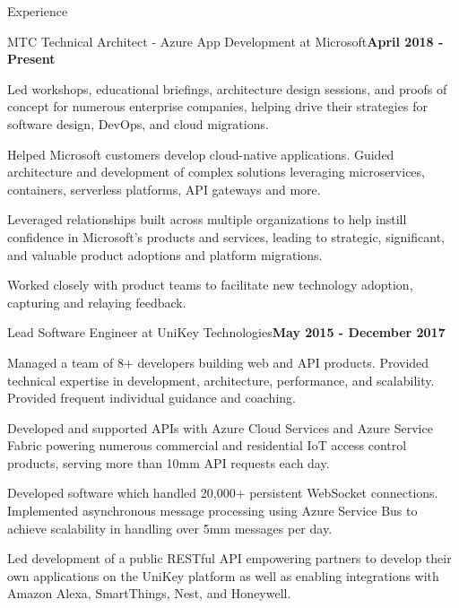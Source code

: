 \documentclass{resume} %
\begin{document}
\begin{rSection}{Experience}


\begin{rSubsection}{MTC Technical Architect - Azure App Development at Microsoft}{\bf April 2018 - Present}{}{}

\item Led workshops, educational briefings, architecture design sessions, and proofs of concept for numerous enterprise companies, helping drive their strategies for software design, DevOps, and cloud migrations.
\item Helped Microsoft customers develop cloud-native applications.  Guided architecture and development of complex solutions leveraging microservices, containers, serverless platforms, API gateways and more.
\item Leveraged relationships built across multiple organizations to help instill confidence in Microsoft's products and services, leading to strategic, significant, and valuable product adoptions and platform migrations.
\item Worked closely with product teams to facilitate new technology adoption, capturing and relaying feedback.

\end{rSubsection}


\begin{rSubsection}{Lead Software Engineer at UniKey Technologies}{\bf May 2015 - December 2017}{}{}

\item Managed a team of 8+ developers building web and API products.  Provided technical expertise in development, architecture,  performance, and scalability.  Provided frequent individual guidance and coaching.
\item Developed and supported APIs with Azure Cloud Services and Azure Service Fabric powering numerous commercial and residential IoT access control products, serving more than 10mm API requests each day.
\item Developed software which handled 20,000+ persistent WebSocket connections. Implemented asynchronous message processing using Azure Service Bus to achieve scalability in handling over 5mm messages per day.
\item Led development of a public RESTful API empowering partners to develop their own applications on the UniKey platform as well as enabling integrations with Amazon Alexa, SmartThings, Nest, and Honeywell.
\end{rSubsection}


\end{rSection}
\end{document}

